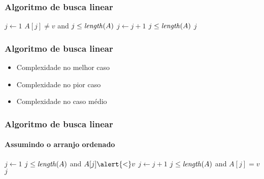 \documentclass{beamer}
\begin{document}
\begin{frame}
  \frametitle{Algoritmo de busca linear}

\begin{codebox}
\zi \Comment {}
\li $j \gets 1$
\li \While $A[j] \neq v$ and $j \le \id{length}(A)$
\li \Do
      $j \gets j+1$
    \End
\li \If $j \le \id{length}(A)$
\li \Then
      \Return $j$
\li \Else
      \Return {}
    \End
\zi \Comment {}
\end{codebox}  

\end{frame}

\begin{frame}
  \frametitle{Algoritmo de busca linear}

\begin{itemize}

  \item Complexidade no melhor caso

  \item Complexidade no pior caso

  \item Complexidade no caso médio

\end{itemize}

\end{frame}

\begin{frame}
  \frametitle{Algoritmo de busca linear}
  \framesubtitle{Assumindo o arranjo ordenado}

\begin{codebox}
\zi \Comment {}
\li $j \gets 1$
\li \While $j \le \id{length}(A)$ and $A[j] \alert{<} v$ 
\li \Do
      $j \gets j+1$
    \End
\li \If $j \le \id{length}(A)$ \alert{and $A[j] = v$}
\li \Then
      \Return $j$
\li \Else
      \Return {}
    \End
\zi \Comment {}
\end{codebox}  

\end{frame}
\end{document}

